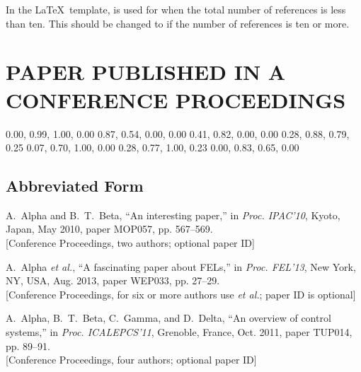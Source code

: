 \documentclass[letterpaper,  %
              ]{jacow-2_3}   %
\begin{document}
In the \LaTeX\ template, \verb|| is used for
when the total number of references is less than ten. This
should be changed to \verb|| if the number of
references is ten or more.



\patchcmd{}
\section{PAPER PUBLISHED IN A CONFERENCE PROCEEDINGS}

\definecolor{jred}{cmyk}  {0.00, 0.99, 1.00, 0.00}
\definecolor{jblue}{cmyk} {0.87, 0.54, 0.00, 0.00}
\definecolor{jvio}{cmyk}  {0.41, 0.82, 0.00, 0.00}
\definecolor{jbook}{cmyk} {0.28, 0.88, 0.79, 0.25}
\definecolor{jrept}{cmyk} {0.07, 0.70, 1.00, 0.00}
\definecolor{jmanu}{cmyk} {0.28, 0.77, 1.00, 0.23}
\definecolor{junpu}{cmyk} {0.00, 0.83, 0.65, 0.00}


\subsection{Abbreviated Form}

\begin{thebibliography}{9} %
	A.~Alpha and B.~T.~Beta, “An interesting paper,”
	in \textit{Proc. IPAC’10}, 
	Kyoto, Japan, May 2010, 
	paper MOP057, pp. 567--569.\\
	\textcolor{jgreen}{[Conference Proceedings, two authors; optional paper ID]}
	
	A.~Alpha \emph{et al.}, 
	“A fascinating paper about FELs,”
	in \emph{Proc. FEL’13}, 
	New York, NY, USA, Aug. 2013, 
	paper WEP033, pp. 27--29.\\
	\textcolor{jgreen}{[Conference Proceedings, for six or more authors use \emph{et al.};	
		paper ID is optional]}
	
	A.~Alpha, B.~T.~Beta, C.~Gamma, and D.~Delta, 
	“An overview of control systems,”
	in \emph{Proc. ICALEPCS’11}, Grenoble, France, Oct. 2011, 
	paper TUP014, pp. 89--91.\\
	\textcolor{jgreen}{[Conference Proceedings, four authors; optional paper ID]}
\end{thebibliography}
\end{document}
